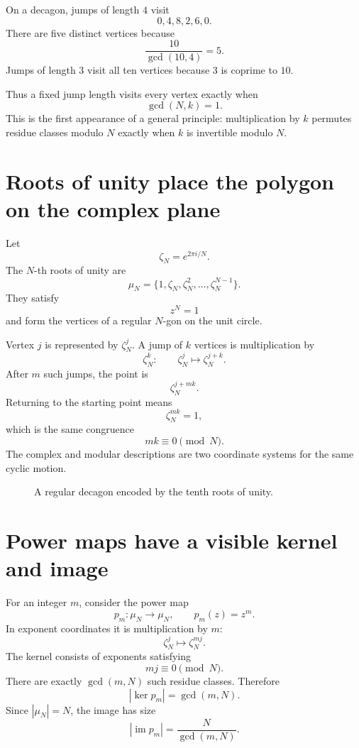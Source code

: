 On a decagon, jumps of length \(4\) visit
\[
  0,4,8,2,6,0.
\]
There are five distinct vertices because
\[
  \frac{10}{\gcd(10,4)}=5.
\]
Jumps of length \(3\) visit all ten vertices because \(3\) is coprime to \(10\).

Thus a fixed jump length visits every vertex exactly when
\[
  \gcd(N,k)=1.
\]
This is the first appearance of a general principle: multiplication by \(k\) permutes residue classes modulo \(N\) exactly when \(k\) is invertible modulo \(N\).

\section{Roots of unity place the polygon on the complex plane}

Let
\[
  \zeta_N=e^{2\pi i/N}.
\]
The \(N\)-th roots of unity are
\[
  \mu_N
  =\{1,\zeta_N,\zeta_N^2,\ldots,\zeta_N^{N-1}\}.
\]
They satisfy
\[
  z^N=1
\]
and form the vertices of a regular \(N\)-gon on the unit circle.

Vertex \(j\) is represented by \(\zeta_N^j\).  A jump of \(k\) vertices is multiplication by
\[
  \zeta_N^k:
  \qquad
  \zeta_N^j\longmapsto\zeta_N^{j+k}.
\]
After \(m\) such jumps, the point is
\[
  \zeta_N^{j+mk}.
\]
Returning to the starting point means
\[
  \zeta_N^{mk}=1,
\]
which is the same congruence
\[
  mk\equiv0\pmod N.
\]
The complex and modular descriptions are two coordinate systems for the same cyclic motion.

\begin{figure}[H]
\centering
{}
\caption{A regular decagon encoded by the tenth roots of unity.}
\end{figure}

\section{Power maps have a visible kernel and image}

For an integer \(m\), consider the power map
\[
  p_m:\mu_N\to\mu_N,
  \qquad
  p_m(z)=z^m.
\]
In exponent coordinates it is multiplication by \(m\):
\[
  \zeta_N^j\longmapsto\zeta_N^{mj}.
\]
The kernel consists of exponents satisfying
\[
  mj\equiv0\pmod N.
\]
There are exactly \(\gcd(m,N)\) such residue classes.  Therefore
\[
  |\ker p_m|=\gcd(m,N).
\]
Since \(|\mu_N|=N\), the image has size
\[
  |\operatorname{im}p_m|
  =\frac{N}{\gcd(m,N)}.
\]

